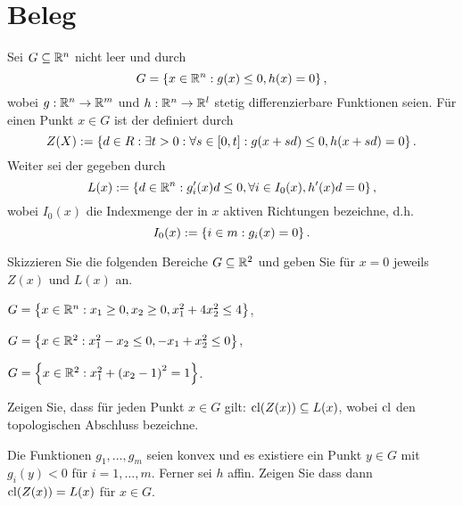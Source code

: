 \section{Beleg}

\begin{exercise}
    Sei $G\subseteq \mathbb{R}^n$ nicht leer und durch
    $$
    G=\left\{x\in\mathbb{R}^n:g(x)\leq 0, h(x)=0\right\},
    $$
    wobei $g:\mathbb{R}^n\rightarrow\mathbb{R}^m$ und $h:\mathbb{R}^n\rightarrow\mathbb{R}^l$ stetig differenzierbare Funktionen seien. Für einen Punkt $x\in G$ ist der  definiert durch
    $$
    Z(X):=\left\{d\in R:\exists t>0:\forall s\in[0,t]:g(x+sd)\leq 0, h(x+sd)=0\right\}. 
    $$
    Weiter sei der  gegeben durch
    $$
    L(x):=\left\{d\in\mathbb{R}^n:g_i'(x)d\leq 0,\forall i\in I_0(x), h'(x)d=0\right\},
    $$
    wobei $I_0(x)$ die Indexmenge der in $x$ aktiven Richtungen bezeichne, d.h.
    $$
    I_0(x):=\left\{i\in m: g_i(x)=0\right\}.
    $$
    \begin{tasks}
            \item Skizzieren Sie die folgenden Bereiche $G\subseteq \mathbb{R}^2$ und geben Sie für $x=0$ jeweils $Z(x)$ und $L(x)$ an.
        \begin{tasks}
                \item $G=\left\{x\in\mathbb{R}^n: x_1\geq 0, x_2\geq 0, x_1^2+4x_2^2\leq 4\right\}$,
                \item $G=\left\{x\in\mathbb{R}^2: x_1^2-x_2\leq 0, -x_1+x_2^2\leq 0\right\}$,
                \item $G=\left\{x\in\mathbb{R}^2:x_1^2+{(x_2-1)}^2=1\right\}$.  
        \end{tasks}
            \item Zeigen Sie, dass für jeden Punkt $x\in G$ gilt: $\mathop\mathrm{cl}(Z(x))\subseteq L(x)$, wobei $\mathop\mathrm{cl}$ den topologischen Abschluss bezeichne.
        \item Die Funktionen $g_1,\ldots,g_m$ seien konvex und es existiere ein Punkt $y\in G$ mit $g_i(y)<0$ für $i=1,\ldots,m$. Ferner sei $h$ affin. Zeigen Sie dass dann $\mathop\mathrm{cl}(Z(x))=L(x)$ für $x\in G$.
    \end{tasks}
\end{exercise}

